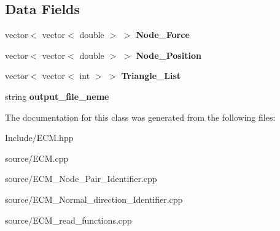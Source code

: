 \subsection*{Data Fields}
\begin{DoxyCompactItemize}
\item 
vector$<$ vector$<$ double $>$ $>$ {\bfseries Node\+\_\+\+Force}\hypertarget{classECM_a8e94479ad96c11957d7aa39d20800134}{}\label{classECM_a8e94479ad96c11957d7aa39d20800134}

\item 
vector$<$ vector$<$ double $>$ $>$ {\bfseries Node\+\_\+\+Position}\hypertarget{classECM_aabd9a09e1f58bb968bbae982f4036b9a}{}\label{classECM_aabd9a09e1f58bb968bbae982f4036b9a}

\item 
vector$<$ vector$<$ int $>$ $>$ {\bfseries Triangle\+\_\+\+List}\hypertarget{classECM_a2cd39dd2c3c5685372f4e5739c0600be}{}\label{classECM_a2cd39dd2c3c5685372f4e5739c0600be}

\item 
string {\bfseries output\+\_\+file\+\_\+neme}\hypertarget{classECM_a5f031b2a0f5f921a84461395adbcb232}{}\label{classECM_a5f031b2a0f5f921a84461395adbcb232}

\end{DoxyCompactItemize}


The documentation for this class was generated from the following files\+:\begin{DoxyCompactItemize}
\item 
Include/E\+C\+M.\+hpp\item 
source/E\+C\+M.\+cpp\item 
source/E\+C\+M\+\_\+\+Node\+\_\+\+Pair\+\_\+\+Identifier.\+cpp\item 
source/E\+C\+M\+\_\+\+Normal\+\_\+direction\+\_\+\+Identifier.\+cpp\item 
source/E\+C\+M\+\_\+read\+\_\+functions.\+cpp\end{DoxyCompactItemize}

